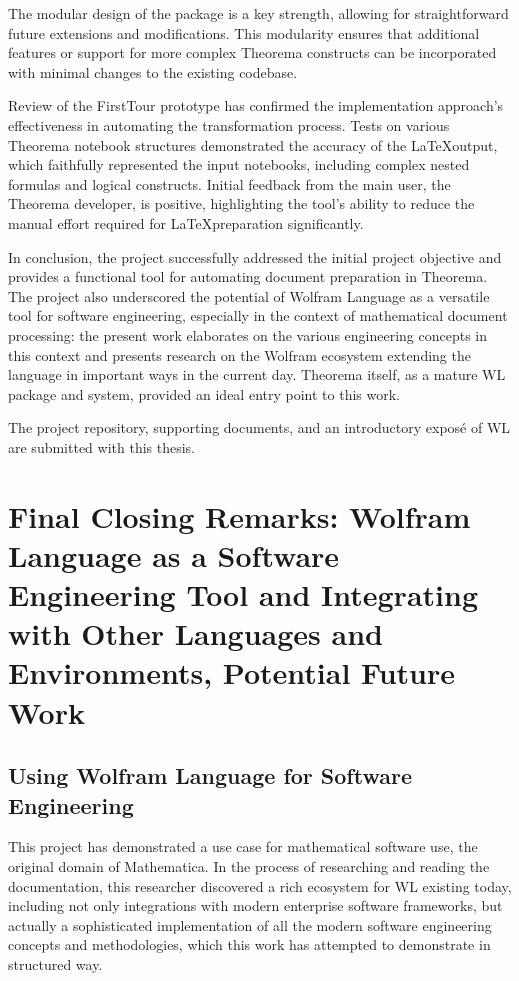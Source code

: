 The modular design of the package is a key strength, allowing for straightforward future extensions and modifications. This modularity ensures that additional features or support for more complex Theorema constructs can be incorporated with minimal changes to the existing codebase. 

Review of the FirstTour prototype has confirmed the implementation approach's effectiveness in automating the transformation process. Tests on various Theorema notebook structures demonstrated the accuracy of the \LaTeX output, which faithfully represented the input notebooks, including complex nested formulas and logical constructs. Initial feedback from the main user, the Theorema developer, is positive, highlighting the tool's ability to reduce the manual effort required for \LaTeX preparation significantly. 

In conclusion, the project successfully addressed the initial project objective and provides a functional tool for automating document preparation in Theorema. The project also underscored the potential of Wolfram Language as a versatile tool for software engineering, especially in the context of mathematical document processing: the present work elaborates on the various engineering concepts in this context and presents research on the Wolfram ecosystem extending the language in important ways in the current day. Theorema itself, as a mature WL package and system, provided an ideal entry point to this work.

The project repository, supporting documents, and an introductory exposé of WL are submitted with this thesis.


\section{Final Closing Remarks: Wolfram Language as a Software Engineering Tool and Integrating with Other Languages and Environments, Potential Future Work}

\subsection{Using Wolfram Language for Software Engineering}

This project has demonstrated a use case for mathematical software use, the original domain of Mathematica. In the process of researching and reading the documentation, this researcher discovered a rich ecosystem for WL existing today, including not only integrations with modern enterprise software frameworks, but actually a sophisticated implementation of all the modern software engineering concepts and methodologies, which this work has attempted to demonstrate in structured way.

